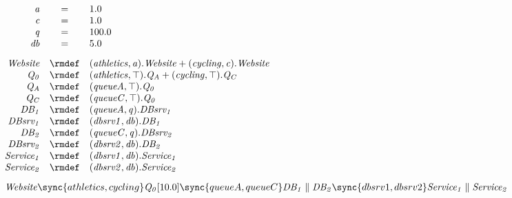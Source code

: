 \begin{displaymath}
	\begin{array}{rcl}
		\mathit{a} & = & 1.0\\
		\mathit{c} & = & 1.0\\
		\mathit{q} & = & 100.0\\
		\mathit{db} & = & 5.0\\
[2.0ex]		\mathit{Website} & \rmdef & (\mathit{athletics},\mathit{a}).\mathit{Website}+(\mathit{cycling},\mathit{c}).\mathit{Website}\\
		\mathit{Q_0} & \rmdef & (\mathit{athletics},\top).\mathit{Q_A}+(\mathit{cycling},\top).\mathit{Q_C}\\
		\mathit{Q_A} & \rmdef & (\mathit{queueA},\top).\mathit{Q_0}\\
		\mathit{Q_C} & \rmdef & (\mathit{queueC},\top).\mathit{Q_0}\\
		\mathit{DB_1} & \rmdef & (\mathit{queueA},\mathit{q}).\mathit{DBsrv_1}\\
		\mathit{DBsrv_1} & \rmdef & (\mathit{dbsrv1},\mathit{db}).\mathit{DB_1}\\
		\mathit{DB_2} & \rmdef & (\mathit{queueC},\mathit{q}).\mathit{DBsrv_2}\\
		\mathit{DBsrv_2} & \rmdef & (\mathit{dbsrv2},\mathit{db}).\mathit{DB_2}\\
		\mathit{Service_1} & \rmdef & (\mathit{dbsrv1},\mathit{db}).\mathit{Service_1}\\
		\mathit{Service_2} & \rmdef & (\mathit{dbsrv2},\mathit{db}).\mathit{Service_2}\\
[2.0ex]		\multicolumn{3}{l}{\mathit{Website}\sync{athletics,cycling}\mathit{Q_0}[10.0]\sync{queueA,queueC}\mathit{DB_1}\parallel\mathit{DB_2}\sync{dbsrv1,dbsrv2}\mathit{Service_1}\parallel\mathit{Service_2}}\\
[2.0ex]	\end{array}
\end{displaymath}
